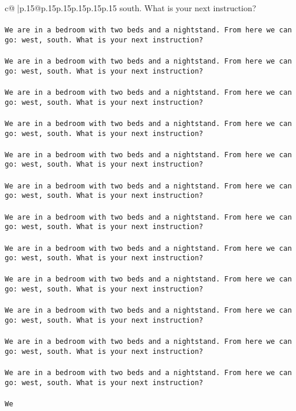 \documentclass{article}
\begin{document}
{\begin{supertabular}{c@{$\;$}|p{.15\linewidth}@{}p{.15\linewidth}p{.15\linewidth}p{.15\linewidth}p{.15\linewidth}p{.15\linewidth}}
{{{south. What is your next instruction?\\ \tt \\ \tt We are in a bedroom with two beds and a nightstand. From here we can go: west, south. What is your next instruction?\\ \tt \\ \tt We are in a bedroom with two beds and a nightstand. From here we can go: west, south. What is your next instruction?\\ \tt \\ \tt We are in a bedroom with two beds and a nightstand. From here we can go: west, south. What is your next instruction?\\ \tt \\ \tt We are in a bedroom with two beds and a nightstand. From here we can go: west, south. What is your next instruction?\\ \tt \\ \tt We are in a bedroom with two beds and a nightstand. From here we can go: west, south. What is your next instruction?\\ \tt \\ \tt We are in a bedroom with two beds and a nightstand. From here we can go: west, south. What is your next instruction?\\ \tt \\ \tt We are in a bedroom with two beds and a nightstand. From here we can go: west, south. What is your next instruction?\\ \tt \\ \tt We are in a bedroom with two beds and a nightstand. From here we can go: west, south. What is your next instruction?\\ \tt \\ \tt We are in a bedroom with two beds and a nightstand. From here we can go: west, south. What is your next instruction?\\ \tt \\ \tt We are in a bedroom with two beds and a nightstand. From here we can go: west, south. What is your next instruction?\\ \tt \\ \tt We are in a bedroom with two beds and a nightstand. From here we can go: west, south. What is your next instruction?\\ \tt \\ \tt We are in a bedroom with two beds and a nightstand. From here we can go: west, south. What is your next instruction?\\ \tt \\ \tt We 
	  } 
	   } 
	   } 
	  \\ 
 


\end{supertabular}}
\end{document}

